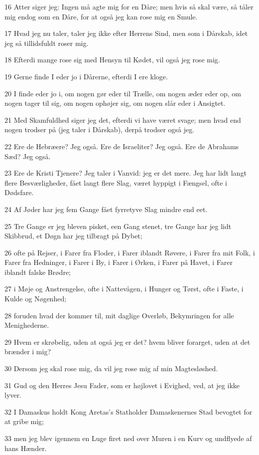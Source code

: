 \par 16 Atter siger jeg: Ingen må agte mig for en Dåre; men hvis så skal være, så tåler mig endog som en Dåre, for at også jeg kan rose mig en Smule.
\par 17 Hvad jeg nu taler, taler jeg ikke efter Herrens Sind, men som i Dårskab, idet jeg så tillidsfuldt roser mig.
\par 18 Efterdi mange rose sig med Hensyn til Kødet, vil også jeg rose mig.
\par 19 Gerne finde I eder jo i Dårerne, efterdi I ere kloge.
\par 20 I finde eder jo i, om nogen gør eder til Trælle, om nogen æder eder op, om nogen tager til sig, om nogen ophøjer sig, om nogen slår eder i Ansigtet.
\par 21 Med Skamfuldhed siger jeg det, efterdi vi have været svage; men hvad end nogen trodser på (jeg taler i Dårskab), derpå trodser også jeg.
\par 22 Ere de Hebræere? Jeg også. Ere de Israeliter? Jeg også. Ere de Abrahams Sæd? Jeg også.
\par 23 Ere de Kristi Tjenere? Jeg taler i Vanvid: jeg er det mere. Jeg har lidt langt flere Besværligheder, fået langt flere Slag, været hyppigt i Fængsel, ofte i Dødsfare.
\par 24 Af Jøder har jeg fem Gange fået fyrretyve Slag mindre end eet.
\par 25 Tre Gange er jeg bleven pisket, een Gang stenet, tre Gange har jeg lidt Skibbrud, et Døgn har jeg tilbragt på Dybet;
\par 26 ofte på Rejser, i Farer fra Floder, i Farer iblandt Røvere, i Farer fra mit Folk, i Farer fra Hedninger, i Farer i By, i Farer i Ørken, i Farer på Havet, i Farer iblandt falske Brødre;
\par 27 i Møje og Anstrengelse, ofte i Nattevågen, i Hunger og Tørst, ofte i Faste, i Kulde og Nøgenhed;
\par 28 foruden hvad der kommer til, mit daglige Overløb, Bekymringen for alle Menighederne.
\par 29 Hvem er skrøbelig, uden at også jeg er det? hvem bliver forarget, uden at det brænder i mig?
\par 30 Dersom jeg skal rose mig, da vil jeg rose mig af min Magtesløshed.
\par 31 Gud og den Herres Jesu Fader, som er højlovet i Evighed, ved, at jeg ikke lyver.
\par 32 I Damaskus holdt Kong Aretas's Statholder Damaskenernes Stad bevogtet for at gribe mig;
\par 33 men jeg blev igennem en Luge firet ned over Muren i en Kurv og undflyede af hans Hænder.

